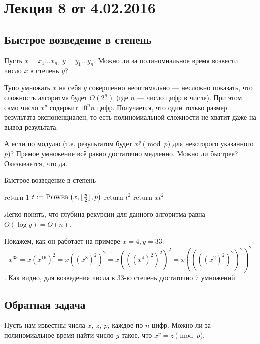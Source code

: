 



\section*{Лекция 8 от 4.02.2016}

\subsection{Быстрое возведение в степень}
Пусть \(x = \overline{x_1 \ldots x_n}\), \(y = \overline{y_1 \ldots y_n}\). Можно ли за полиномиальное время возвести число $x$ в степень $y$?

Тупо умножать $x$ на себя $y$ совершенно неоптимально --- несложно показать, что сложность алгоритма будет $O(2^n)$ (где $n$ --- число цифр в числе). При этом само число $x^y$ содержит \(10^{n}n\) цифр. Получается, что один только размер результата экспоненциален, то есть полиномиальной сложности не хватит даже на вывод результата.

А если по модулю (т.е. результатом будет \(x^y \pmod{p}\) для некоторого указанного \(p\))? Прямое умножение всё равно достаточно медленно. Можно ли быстрее? Оказывается, что да.

\begin{algorithm}
	\caption{Быстрое возведение в степень}
	\begin{algorithmic}[1]
			\State return 1
		\EndIf
		\State \(t \mathrel{:=} \textsc{Power}\left(x, \lfloor\frac{y}{2}\rfloor, p \right)\)
			\State return \(t^2\)
		\Else
			\State return \(xt^2\)
		\EndIf
		\EndFunction
	\end{algorithmic}
\end{algorithm}

Легко понять, что глубина рекурсии для данного алгоритма равна $O(\log y) = O(n)$.

Покажем, как он работает на примере \(x = 4, y = 33\): \[x^{33} = x(x^{16})^{2} = x((x^{8})^2)^2 = x(((x^4)^2)^2)^2 = x((((x^2)^2)^2)^2)^2 \].
Как видно, для возведения числа в 33-ю степень достаточно 7 умножений.

\subsection{Обратная задача}

Пусть нам известны числа $x,\ z,\ p$, каждое по $n$ цифр. Можно ли за полиномиальное время найти число $y$ такое, что $x^y = z \pmod{p}$.

